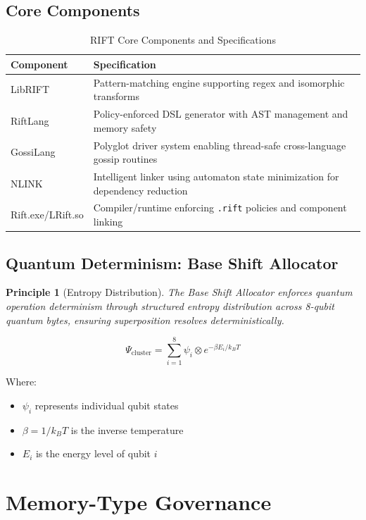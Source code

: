 \documentclass[12pt]{article}
\newtheorem{principle}{Principle}
\begin{document}
\subsection{Core Components}
\begin{table}[H]
\centering
\caption{RIFT Core Components and Specifications}
\begin{tabular}{|l|p{8cm}|}
\hline
\textbf{Component} & \textbf{Specification} \\
\hline
LibRIFT & Pattern-matching engine supporting regex and isomorphic transforms \\
\hline
RiftLang & Policy-enforced DSL generator with AST management and memory safety \\
\hline
GossiLang & Polyglot driver system enabling thread-safe cross-language gossip routines \\
\hline
NLINK & Intelligent linker using automaton state minimization for dependency reduction \\
\hline
Rift.exe/LRift.so & Compiler/runtime enforcing \texttt{.rift} policies and component linking \\
\hline
\end{tabular}
\end{table}

\subsection{Quantum Determinism: Base Shift Allocator}
\begin{principle}[Entropy Distribution]
The Base Shift Allocator enforces quantum operation determinism through structured entropy distribution across 8-qubit quantum bytes, ensuring superposition resolves deterministically.
\end{principle}

\begin{equation}
\boxed{
\Psi_{\text{cluster}} = \sum_{i=1}^{8} \psi_i \otimes e^{-\beta E_i/k_B T}
}
\end{equation}

Where:
\begin{itemize}
\item $\psi_i$ represents individual qubit states
\item $\beta = 1/k_B T$ is the inverse temperature
\item $E_i$ is the energy level of qubit $i$
\end{itemize}

\section{Memory-Type Governance}
\end{document}
